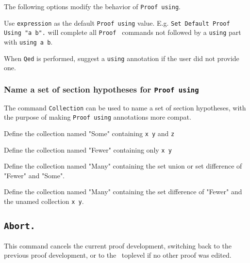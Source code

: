 The following options modify the behavior of {\tt Proof using}.


  Use {\tt expression} as the default {\tt Proof using} value.
  E.g. {\tt Set Default Proof Using "a b".} will complete all {\tt Proof }
  commands not followed by a {\tt using} part with {\tt using a b}.


  When {\tt Qed} is performed, suggest a {\tt using} annotation if
  the user did not provide one.

\subsubsection[\tt Collection]{Name a set of section hypotheses for {\tt Proof using}}
\label{Collection}

The command {\tt Collection} can be used to name a set of section hypotheses,
with the purpose of making {\tt Proof using} annotations more compat.


  Define the collection named "Some" containing {\tt x y} and {\tt z} 

  
  Define the collection named "Fewer" containing only {\tt x y} 

  
  Define the collection named "Many" containing the set union or set difference
  of "Fewer" and "Some".


  Define the collection named "Many" containing the set difference
  of "Fewer" and the unamed collection {\tt x y}.

\subsection[\tt Abort.]{\tt Abort.}

This command cancels the current proof development, switching back to
the previous proof development, or to the \Coq\ toplevel if no other
proof was edited.

\begin{ErrMsgs}
\item {}
\end{ErrMsgs}

